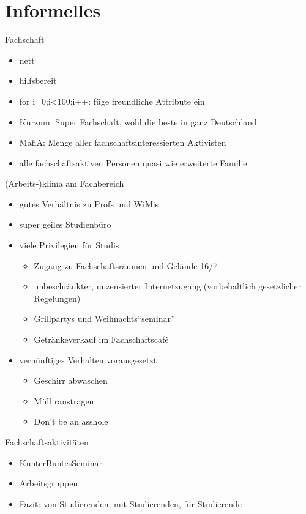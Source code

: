 \documentclass{beamer}
\begin{document}
\section{Informelles}
\begin{frame}{Fachschaft}
  \begin{itemize}
    \item nett
    \item hilfsbereit
    \item for i=0;i<100;i++: füge freundliche Attribute ein
    \item Kurzum: Super Fachschaft, wohl die beste in ganz Deutschland
    \item MafiA: Menge aller fachschaftsinteressierten Aktivisten
    \item alle fachschaftsaktiven Personen quasi wie erweiterte Familie
  \end{itemize}
\end{frame}
\begin{frame}{(Arbeits-)klima am Fachbereich}
  \begin{itemize}
    \item gutes Verhältnis zu Profs und WiMis
    \item super geiles Studienbüro
    \item viele Privilegien für Studis
    \begin{itemize}
      \item Zugang zu Fachschaftsräumen und Gelände 16/7
      \item unbeschränkter, unzensierter Internetzugang (vorbehaltlich gesetzlicher Regelungen)
      \item Grillpartys und Weihnachts"`seminar"'
      \item Getränkeverkauf im Fachschaftscafé
    \end{itemize}
    \item vernünftiges Verhalten vorausgesetzt
    \begin{itemize}
      \item Geschirr abwaschen
      \item Müll raustragen
      \item Don't be an asshole
    \end{itemize}
  \end{itemize}
\end{frame}
\begin{frame}{Fachschaftsaktivitäten}
  \begin{itemize}
    \item KunterBuntesSeminar
    \item Arbeitsgruppen
    \item Fazit: von Studierenden, mit Studierenden, für Studierende
  \end{itemize}
\end{frame}
\end{document}
